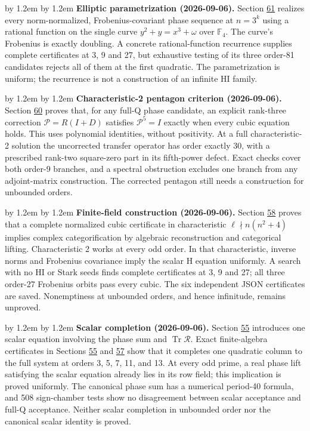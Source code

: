 \documentclass[11pt,reqno]{amsart}
\theoremstyle{plain}
\newenvironment{revnote}%
  {\par\addvspace{0.7\baselineskip}\begingroup\small
   \advance\leftskip by 1.2em \advance\rightskip by 1.2em \noindent\ignorespaces}%
  {\par\endgroup\addvspace{0.7\baselineskip}}
\begin{document}
\begin{revnote}
\textbf{Elliptic parametrization (2026-09-06).} Section \hyperref[sec:61]{61} realizes every norm-normalized, Frobenius-covariant phase sequence at \(n=3^k\) using a rational function on the single curve \(y^2+y=x^3+\omega\) over \(\mathbb F_4\). The curve's Frobenius is exactly doubling. A concrete rational-function recurrence supplies complete certificates at 3, 9 and 27, but exhaustive testing of its three order-81 candidates rejects all of them at the first quadratic. The parametrization is uniform; the recurrence is not a construction of an infinite HI family.
\end{revnote}

\begin{revnote}
\textbf{Characteristic-2 pentagon criterion (2026-09-06).} Section \hyperref[sec:60]{60} proves that, for any full-Q phase candidate, an explicit rank-three correction \(\mathcal P=R(I+D)\) satisfies \(\mathcal P^5=I\) exactly when every cubic equation holds. This uses polynomial identities, without positivity. At a full characteristic-2 solution the uncorrected transfer operator has order exactly 30, with a prescribed rank-two square-zero part in its fifth-power defect. Exact checks cover both order-9 branches, and a spectral obstruction excludes one branch from any adjoint-matrix construction. The corrected pentagon still needs a construction for unbounded orders.
\end{revnote}

\begin{revnote}
\textbf{Finite-field construction (2026-09-06).} Section \hyperref[sec:58]{58} proves that a complete normalized cubic certificate in characteristic \(\ell\nmid n(n^2+4)\) implies complex categorification by algebraic reconstruction and categorical lifting. Characteristic 2 works at every odd order. In that characteristic, inverse norms and Frobenius covariance imply the scalar H equation uniformly. A search with no HI or Stark seeds finds complete certificates at 3, 9 and 27; all three order-27 Frobenius orbits pass every cubic. The six independent JSON certificates are saved. Nonemptiness at unbounded orders, and hence infinitude, remains unproved.
\end{revnote}

\begin{revnote}
\textbf{Scalar completion (2026-09-06).} Section \hyperref[sec:55]{55} introduces one scalar equation involving the phase sum and \(\operatorname{Tr}\mathcal R\). Exact finite-algebra certificates in Sections \hyperref[sec:55]{55} and \hyperref[sec:57]{57} show that it completes one quadratic column to the full system at orders 3, 5, 7, 11, and 13. At every odd prime, a real phase lift satisfying the scalar equation already lies in its row field; this implication is proved uniformly. The canonical phase sum has a numerical period-40 formula, and 508 sign-chamber tests show no disagreement between scalar acceptance and full-Q acceptance. Neither scalar completion in unbounded order nor the canonical scalar identity is proved.
\end{revnote}
\end{document}
